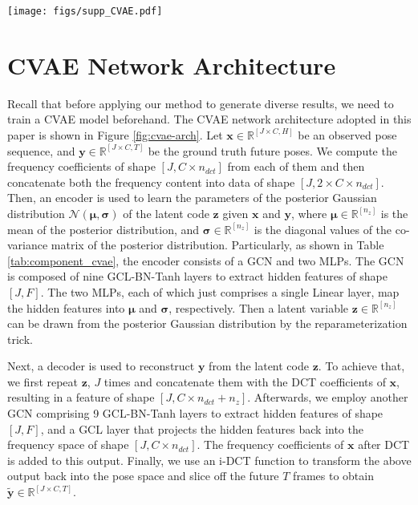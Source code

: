 \documentclass[sigconf,screen,nonacm]{acmart}
\begin{document}
	\begin{figure*}[!t]
		\centering
		\texttt{[image: figs/supp\_CVAE.pdf]}\\
		\caption{Detailed architecture of the adopted CVAE model. It is composed of an encoder and a decoder that are built on GCNs and MLPs. Please refer to the main text for detailed descriptions of the architecture.}
\label{fig:cvae-arch}
	\end{figure*}
	
	
	\section{CVAE Network Architecture}
	Recall that before applying our method to generate diverse results, we need to train a CVAE model beforehand. The CVAE network architecture adopted in this paper is shown in Figure \ref{fig:cvae-arch}. 
	Let $\mathbf{x} \in \mathbb{R}^{[J \times C, H]}$ be an observed pose sequence, and $\mathbf{y} \in \mathbb{R}^{[J \times C, T]}$ be the ground truth future poses. We compute the frequency coefficients of shape $[J, C \times n_{dct}]$ from each of them and then concatenate both the frequency content into data of shape $[J, 2 \times C \times n_{dct}]$.
	Then, an encoder is used to learn the parameters of the posterior Gaussian distribution $\mathcal{N}(\bm{\mu}, \bm{\sigma})$ of the latent code $\mathbf{z}$ given $\mathbf{x}$ and $\mathbf{y}$, where $\bm{\mu} \in \mathbb{R}^{[n_z]}$ is the mean of the posterior distribution, and $\bm{\sigma} \in \mathbb{R}^{[n_z]}$ is the diagonal values of the co-variance matrix of the posterior distribution.
	Particularly, as shown in Table \ref{tab:component_cvae}, the encoder consists of a GCN and two MLPs. The GCN is composed of nine GCL-BN-Tanh layers to extract hidden features of shape $[J, F]$. The two MLPs, each of which just comprises a single Linear layer, map the hidden features into $\bm{\mu}$ and $\bm{\sigma}$, respectively.
	Then a latent variable $\mathbf{z} \in \mathbb{R}^{[n_z]}$ can be drawn from the posterior Gaussian distribution by the reparameterization trick.
	
	Next, a decoder is used to reconstruct $\mathbf{y}$ from the latent code $\mathbf{z}$.
	To achieve that, we first repeat $\mathbf{z}$, $J$ times and concatenate them with the DCT coefficients of $\mathbf{x}$, resulting in a feature of shape $[J, C \times n_{dct} + n_z]$.
	Afterwards, we employ another GCN comprising 9 GCL-BN-Tanh layers to extract hidden features of shape $[J, F]$, and a GCL layer that projects the hidden features back into the frequency space of shape $[J, C \times n_{dct}]$.
	The frequency coefficients of $\mathbf{x}$ after DCT is added to this output.
	Finally, we use an i-DCT function to transform the above output back into the pose space and slice off the future $T$ frames to obtain $\mathbf{\tilde{y}} \in \mathbb{R}^{[J \times C, T]}$.
	
\end{document}
